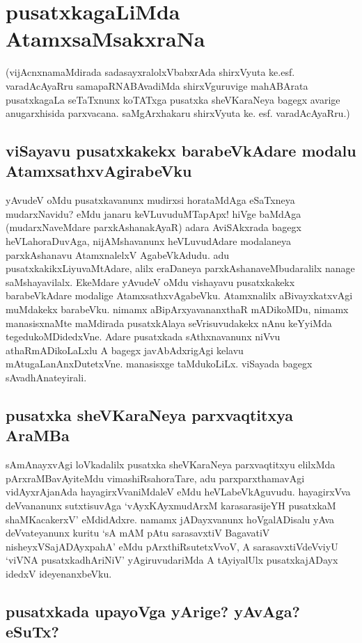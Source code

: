 \chapter{pusatxkagaLiMda AtamxsaMsakxraNa}

(vijAcnxnamaMdirada sadasayxralolxVbabxrAda shirxVyuta ke.esf. varadAcAyaRru samapaRNABAvadiMda shirxVguruvige mahABArata pusatxkagaLa seTaTxnunx koTATxga pusatxka sheVKaraNeya bagegx  avarige anugarxhisida parxvacana. saMgArxhakaru shirxVyuta ke. esf. varadAcAyaRru.)

\section*{viSayavu pusatxkakekx barabeVkAdare modalu AtamxsathxvAgirabeVku}

yAvudeV oMdu pusatxkavanunx mudirxsi horataMdAga eSaTxneya mudarxNavidu? eMdu janaru keVLuvuduMTapApx! hiVge baMdAga (mudarxNaveMdare parxkAshanakAyaR) adara AviSAkxrada bagegx heVLahoraDuvAga, nijAMshavanunx heVLuvudAdare modalaneya parxkAshanavu AtamxnalelxV AgabeVkAdudu. adu pusatxkakikxLiyuvaMtAdare, alilx eraDaneya parxkAshanaveMbudaralilx nanage saMshayavilalx. EkeMdare yAvudeV oMdu vishayavu pusatxkakekx barabeVkAdare modalige AtamxsathxvAgabeVku. Atamxnalilx aBivayxkatxvAgi muMdakekx barabeVku. nimamx aBipArxyavananxthaR mADikoMDu, nimamx manasisxnaMte maMdirada pusatxkAlaya seVrisuvudakekx nAnu keYyiMda tegedukoMDidedxVne. Adare pusatxkada sAthxnavanunx niVvu athaRmADikoLaLxlu A bagegx javAbAdxrigAgi kelavu mAtugaLanAnxDutetxVne. manasisxge taMdukoLiLx. viSayada bagegx sAvadhAnateyirali.

\section*{pusatxka sheVKaraNeya parxvaqtitxya AraMBa}

sAmAnayxvAgi loVkadalilx pusatxka sheVKaraNeya parxvaqtitxyu elilxMda pArxraMBavAyiteMdu vimashiRsahoraTare, adu parxparxthamavAgi vidAyxrAjanAda hayagirxVvaniMdaleV eMdu heVLabeVkAguvudu. hayagirxVva deVvananunx sutxtisuvAga `vAyxKAyxmudArxM karasarasijeYH pusatxkaM shaMKacakerxV'\label{100} eMdidAdxre. namamx jADayxvanunx hoVgalADisalu yAva deVvateyanunx kuritu `sA mAM pAtu sarasavxtiV BagavatiV nisheyxVSajADAyxpahA'\label{100a} eMdu pArxthiRsutetxVvoV, A sarasavxtiVdeVviyU `viVNA pusatxkadhAriNiV' yAgiruvudariMda A tAyiyalUlx pusatxkajADayx idedxV ideyenanxbeVku.

\section*{pusatxkada upayoVga yArige? yAvAga? eSuTx?}

